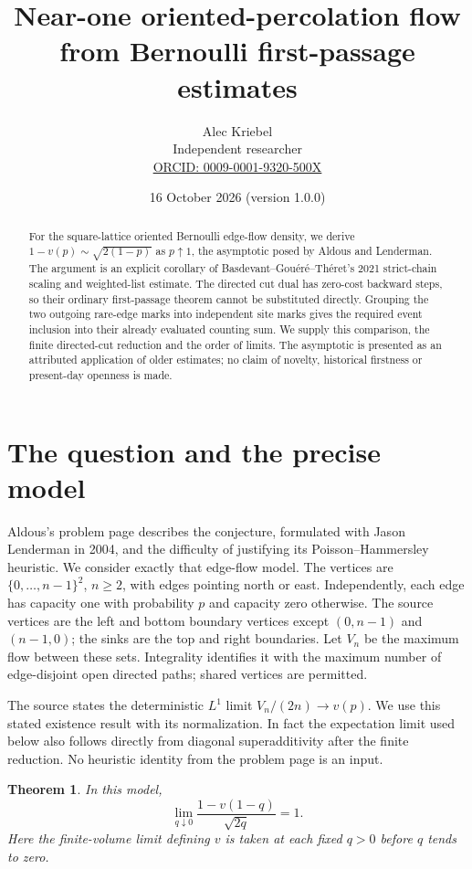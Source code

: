 \documentclass[11pt]{article}
\title{Near-one oriented-percolation flow\\from Bernoulli first-passage estimates}
\author{Alec Kriebel\\\small Independent researcher\\
\small\href{https://orcid.org/0009-0001-9320-500X}{ORCID: 0009-0001-9320-500X}}
\date{16 October 2026 \quad (version 1.0.0)}
\newtheorem{theorem}{Theorem}
\begin{document}
\maketitle

\begin{abstract}
For the square-lattice oriented Bernoulli edge-flow density, we derive
$1-v(p)\sim\sqrt{2(1-p)}$ as $p\uparrow1$, the asymptotic posed by
Aldous and Lenderman. The argument is an explicit corollary of
Basdevant--Gou\'er\'e--Th\'eret's 2021 strict-chain scaling and
weighted-list estimate. The directed cut dual has zero-cost backward
steps, so their ordinary first-passage theorem cannot be substituted
directly. Grouping the two outgoing rare-edge marks into independent
site marks gives the required event inclusion into their already
evaluated counting sum. We supply this comparison, the finite
directed-cut reduction and the order of limits. The asymptotic is
presented as an attributed application of older estimates; no claim of
novelty, historical firstness or present-day openness is made.
\end{abstract}

\section{The question and the precise model}

Aldous's problem page \cite{Aldous} describes the conjecture, formulated
with Jason Lenderman in 2004, and the difficulty of justifying its
Poisson--Hammersley heuristic. We consider exactly that edge-flow model.
The vertices are $\{0,\ldots,n-1\}^2$, $n\ge2$, with edges pointing north
or east. Independently, each edge has capacity one with probability $p$
and capacity zero otherwise. The source vertices are the left and
bottom boundary vertices except $(0,n-1)$ and $(n-1,0)$; the sinks are
the top and right boundaries. Let $V_n$ be the maximum flow between
these sets. Integrality identifies it with the maximum number of
edge-disjoint open directed paths; shared vertices are permitted.

The source states the deterministic $L^1$ limit
$V_n/(2n)\longrightarrow v(p)$. We use this stated existence result
with its normalization. In fact the expectation limit used below also
follows directly from diagonal superadditivity after the finite
reduction. No heuristic identity from the problem page is an input.

\begin{theorem}\label{main}
In this model,
\[
 \lim_{q\downarrow0}\frac{1-v(1-q)}{\sqrt{2q}}=1.
\]
Here the finite-volume limit defining $v$ is taken at each fixed $q>0$
before $q$ tends to zero.
\end{theorem}
\end{document}

